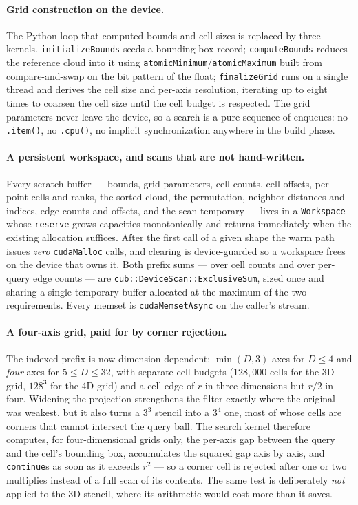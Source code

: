 \documentclass[11pt]{article}
\begin{document}
\paragraph{Grid construction on the device.}
The Python loop that computed bounds and cell sizes is replaced by three
kernels. \texttt{initializeBounds} seeds a bounding-box record;
\texttt{computeBounds} reduces the reference cloud into it using
\texttt{atomicMinimum}/\texttt{atomicMaximum} built from compare-and-swap on the
bit pattern of the float; \texttt{finalizeGrid} runs on a single thread and
derives the cell size and per-axis resolution, iterating up to eight times to
coarsen the cell size until the cell budget is respected. The grid parameters
never leave the device, so a search is a pure sequence of enqueues: no
\texttt{.item()}, no \texttt{.cpu()}, no implicit synchronization anywhere in the
build phase.

\paragraph{A persistent workspace, and scans that are not hand-written.}
Every scratch buffer --- bounds, grid parameters, cell counts, cell offsets,
per-point cells and ranks, the sorted cloud, the permutation, neighbor distances
and indices, edge counts and offsets, and the scan temporary --- lives in a
\texttt{Workspace} whose \texttt{reserve} grows capacities monotonically and
returns immediately when the existing allocation suffices. After the first call
of a given shape the warm path issues \emph{zero} \texttt{cudaMalloc} calls, and
clearing is device-guarded so a workspace frees on the device that owns it. Both
prefix sums --- over cell counts and over per-query edge counts --- are
\texttt{cub::DeviceScan::ExclusiveSum}, sized once and sharing a single temporary
buffer allocated at the maximum of the two requirements. Every memset is
\texttt{cudaMemsetAsync} on the caller's stream.

\paragraph{A four-axis grid, paid for by corner rejection.}
The indexed prefix is now dimension-dependent: $\min(D,3)$ axes for $D \le 4$ and
\emph{four} axes for $5 \le D \le 32$, with separate cell budgets ($128{,}000$
cells for the 3D grid, $128^3$ for the 4D grid) and a cell edge of $r$ in three
dimensions but $r/2$ in four. Widening the projection strengthens the filter
exactly where the original was weakest, but it also turns a $3^3$ stencil into a
$3^4$ one, most of whose cells are corners that cannot intersect the query ball.
The search kernel therefore computes, for four-dimensional grids only, the
per-axis gap between the query and the cell's bounding box, accumulates the
squared gap axis by axis, and \texttt{continue}s as soon as it exceeds $r^2$ ---
so a corner cell is rejected after one or two multiplies instead of a full scan
of its contents. The same test is deliberately \emph{not} applied to the 3D
stencil, where its arithmetic would cost more than it saves.
\end{document}
